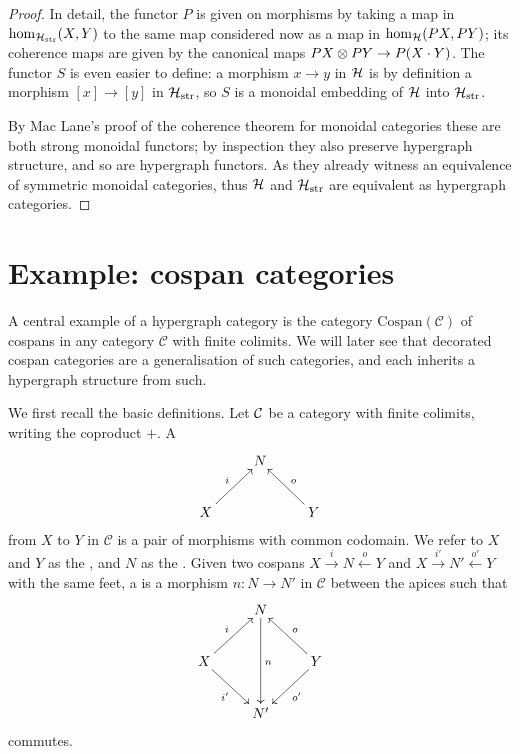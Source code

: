 \begin{proof}
  In detail, the functor $P$ is given on morphisms by taking a map in
  $\mathrm{hom}_{\mathcal H_{\mathrm{str}}}(X,Y)$ to the same map considered now as a
  map in $\mathrm{hom}_{\mathcal H}(PX,PY)$; its coherence maps are given by the
  canonical maps $PX \otimes PY \to P(X\cdot Y)$. The functor $S$ is even easier to
  define: a morphism $x \to y$ in $\mathcal H$ is by definition a morphism $[x] \to
  [y]$ in $\mathcal H_{\mathrm{str}}$, so $S$ is a monoidal embedding of $\mathcal H$ into
  $\mathcal H_{\mathrm{str}}$. 
  
  By Mac Lane's proof of the coherence theorem for monoidal categories these are
  both strong monoidal functors; by inspection they also preserve hypergraph
  structure, and so are hypergraph functors.  As they already witness an
  equivalence of symmetric monoidal categories, thus $\mathcal H$ and $\mathcal
  H_{\mathrm{str}}$ are equivalent as hypergraph categories.
\end{proof}

\section{Example: cospan categories}

A central example of a hypergraph category is the category
$\mathrm{Cospan(\mathcal C)}$ of cospans in any category $\mathcal C$ with
finite colimits. We will later see that decorated cospan categories are a
generalisation of such categories, and each inherits a hypergraph structure
from such. 

We first recall the basic definitions. Let $\mathcal C$ be a category with finite
colimits, writing the coproduct $+$. A 
\[
  \xymatrix{
    & N \\
    X \ar[ur]^{i} && Y \ar[ul]_{o}
  }
\]
from $X$ to $Y$ in $\mathcal C$ is a pair of morphisms with common codomain. We
refer to $X$ and $Y$ as the , and $N$ as the .  Given
two cospans $X \stackrel{i}{\longrightarrow} N \stackrel{o}{\longleftarrow} Y$
and $X \stackrel{i'}{\longrightarrow} N' \stackrel{o'}{\longleftarrow} Y$ with
the same feet, a  is a morphism $n\colon  N \to N'$ in
$\mathcal C$ between the apices such that
\[
  \xymatrix{
    & N \ar[dd]^n  \\
    X \ar[ur]^{i} \ar[dr]_{i'} && Y \ar[ul]_{o} \ar[dl]^{o'}\\
    & N'
  }
\]
commutes.

